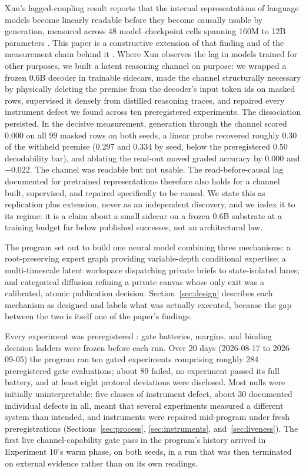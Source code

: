 \documentclass[10pt,a4paper]{article}
\begin{document}
Xun's lagged-coupling result reports that the internal representations of
language models become linearly readable before they become causally usable
by generation, measured across 48 model--checkpoint cells spanning 160M to
12B parameters \cite{xun2026lagged}. This paper is a constructive extension
of that finding and of the measurement chain behind it
\cite{xun2026evidence,xun2026routing,xun2026located}. Where Xun observes the
lag in models trained for other purposes, we built a latent reasoning channel
on purpose: we wrapped a frozen 0.6B decoder in trainable sidecars, made the
channel structurally necessary by physically deleting the premise from the
decoder's input token ids on masked rows, supervised it densely from
distilled reasoning traces, and repaired every instrument defect we found
across ten preregistered experiments. The dissociation persisted. In the
decisive measurement, generation through the channel scored 0.000 on all 99
masked rows on both seeds, a linear probe recovered roughly 0.30 of the
withheld premise (0.297 and 0.334 by seed, below the preregistered 0.50
decodability bar), and ablating the read-out moved graded accuracy by 0.000
and $-0.022$. The channel was readable but not usable. The read-before-causal
lag documented for pretrained representations therefore also holds for a
channel built, supervised, and repaired specifically to be causal. We state
this as replication plus extension, never as an independent discovery, and we
index it to its regime: it is a claim about a small sidecar on a frozen 0.6B
substrate at a training budget far below published successes, not an
architectural law.

The program set out to build one neural model combining three mechanisms: a
root-preserving expert graph providing variable-depth conditional expertise;
a multi-timescale latent workspace dispatching private briefs to
state-isolated lanes; and categorical diffusion refining a private canvas
whose only exit was a calibrated, atomic publication decision.
Section~\ref{sec:design} describes each mechanism as designed and labels what
was actually executed, because the gap between the two is itself one of the
paper's findings.

Every experiment was preregistered \cite{vanmiltenburg2021}: gate batteries,
margins, and binding decision ladders were frozen before each run. Over 20
days (2026-08-17 to 2026-09-05) the program ran ten gated experiments
comprising roughly 284 preregistered gate evaluations; about 89 failed, no
experiment passed its full battery, and at least eight protocol deviations
were disclosed. Most nulls were initially uninterpretable: five classes of
instrument defect, about 30 documented individual defects in all, meant that
several experiments measured a different system than intended, and
instruments were repaired mid-program under fresh preregistrations
(Sections~\ref{sec:process}, \ref{sec:instruments}, and~\ref{sec:liveness}).
The first live channel-capability gate pass in the program's history arrived
in Experiment 10's warm phase, on both seeds, in a run that was then
terminated on external evidence rather than on its own readings.
\end{document}
